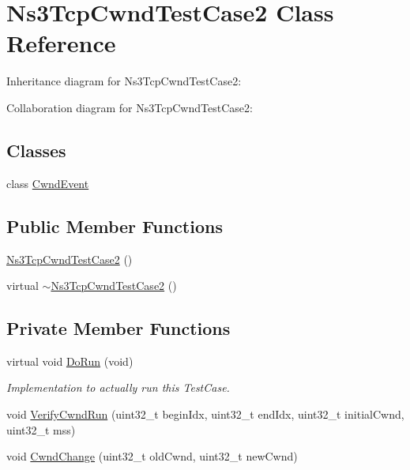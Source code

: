 \hypertarget{classNs3TcpCwndTestCase2}{}\section{Ns3\+Tcp\+Cwnd\+Test\+Case2 Class Reference}
\label{classNs3TcpCwndTestCase2}


Inheritance diagram for Ns3\+Tcp\+Cwnd\+Test\+Case2\+:


Collaboration diagram for Ns3\+Tcp\+Cwnd\+Test\+Case2\+:
\subsection*{Classes}
\begin{DoxyCompactItemize}
\item 
class \hyperlink{classNs3TcpCwndTestCase2_1_1CwndEvent}{Cwnd\+Event}
\end{DoxyCompactItemize}
\subsection*{Public Member Functions}
\begin{DoxyCompactItemize}
\item 
\hyperlink{classNs3TcpCwndTestCase2_a065b54bbc8921bf0d93b97c40ec525c9}{Ns3\+Tcp\+Cwnd\+Test\+Case2} ()
\item 
virtual \hyperlink{classNs3TcpCwndTestCase2_a0ca39c2ee286a9f75068355c6842649b}{$\sim$\+Ns3\+Tcp\+Cwnd\+Test\+Case2} ()
\end{DoxyCompactItemize}
\subsection*{Private Member Functions}
\begin{DoxyCompactItemize}
\item 
virtual void \hyperlink{classNs3TcpCwndTestCase2_a861689d2e951548eacc10b7f5c24540d}{Do\+Run} (void)
\begin{DoxyCompactList}\small\item\em Implementation to actually run this Test\+Case. \end{DoxyCompactList}\item 
void \hyperlink{classNs3TcpCwndTestCase2_af24f479c923a480f751187f05bda69d1}{Verify\+Cwnd\+Run} (uint32\+\_\+t begin\+Idx, uint32\+\_\+t end\+Idx, uint32\+\_\+t initial\+Cwnd, uint32\+\_\+t mss)
\item 
void \hyperlink{classNs3TcpCwndTestCase2_a1e9ae03c6f411d674199824234aefc1a}{Cwnd\+Change} (uint32\+\_\+t old\+Cwnd, uint32\+\_\+t new\+Cwnd)
\end{DoxyCompactItemize}
